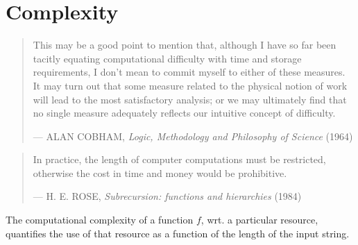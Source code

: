 
\chapter{Complexity}

\begin{quotation}

\footnotesize\sffamily\itshape

\begin{flushright}

This may be a good point to mention that, although I have so far been tacitly
equating computational difficulty with time and storage requirements, I don't
mean to commit myself to either of these measures. It may turn out that some
measure related to the physical notion of work will lead to the most
satisfactory analysis; or we may ultimately find that no single measure
adequately reflects our intuitive concept of difficulty.

\smallbreak

\upshape

--- ALAN COBHAM, {\itshape Logic, Methodology and Philosophy of Science} (1964)

\end{flushright}

\end{quotation}

\begin{quotation}

\footnotesize\sffamily\itshape

\begin{flushright}

In practice, the length of computer computations must be restricted, otherwise
the cost in time and money would be prohibitive.

\smallbreak

\upshape

--- H. E. ROSE, {\itshape Subrecursion: functions and hierarchies} (1984)

\end{flushright}

\end{quotation}

\begin{definition} The computational complexity of a function $f$, wrt. a
particular resource, quantifies the use of that resource as a function of the
length of the input string.\end{definition}

